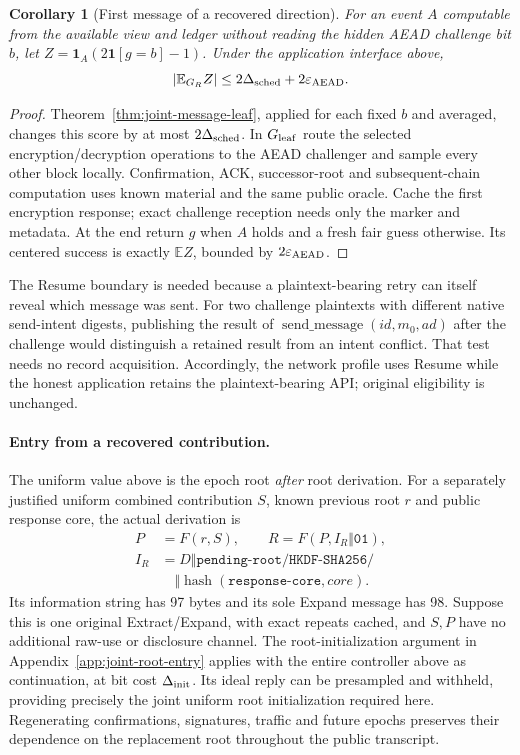 \documentclass[pdflatex]{sn-jnl}
\theoremstyle{thmstyleone}
\newtheorem{corollary}[theorem]{Corollary}
\theoremstyle{thmstylethree}
\theoremstyle{thmstyletwo}
\begin{document}
\begin{corollary}[First message of a recovered direction]
\label{cor:joint-first-message}
For an event $A$ computable from the available view and ledger without
reading the hidden AEAD challenge bit $b$, let
$Z=\mathbf1_A(2\mathbf1[g=b]-1)$.
Under the application interface above,
\[
 |\mathbb E_{G_R}Z|
 \le 2\Delta_{\rm sched}+2\varepsilon_{\rm AEAD}.
\]
\end{corollary}
\begin{proof}
Theorem~\ref{thm:joint-message-leaf}, applied for each fixed $b$ and
averaged, changes this score by at most $2\Delta_{\rm sched}$.
In $G_{\rm leaf}$ route the selected encryption/decryption operations
to the AEAD challenger and sample every other block locally.
Confirmation, ACK, successor-root and subsequent-chain computation uses
known material and the same public oracle. Cache the first encryption
response; exact challenge reception needs only the marker and metadata.
At the end return $g$ when $A$ holds and a fresh fair guess otherwise.
Its centered success is exactly $\mathbb E Z$, bounded by
$2\varepsilon_{\rm AEAD}$.
\end{proof}

The Resume boundary is needed because a plaintext-bearing retry can
itself reveal which message was sent. For two challenge plaintexts with
different native send-intent digests, publishing the result of
$\operatorname{send\_message}(id,m_0,ad)$ after the challenge would
distinguish a retained result from an intent conflict. That test needs
no record acquisition. Accordingly, the network profile uses Resume
while the honest application retains the plaintext-bearing API;
original eligibility is unchanged.

\paragraph{Entry from a recovered contribution.}
The uniform value above is the epoch root \emph{after} root derivation.
For a separately justified uniform combined contribution $S$, known
previous root $r$ and public response core, the actual derivation is
\[
\begin{aligned}
 P&=F(r,S),\qquad R=F(P,I_R\Vert\mathtt{01}),\\
 I_R&=D\Vert\texttt{pending-root/HKDF-SHA256/}\\
    &\quad\Vert\operatorname{hash}(\texttt{response-core},\mathit{core}).
\end{aligned}
\]
Its information string has 97 bytes and its sole Expand message has 98.
Suppose this is one original Extract/Expand, with exact repeats cached,
and $S,P$ have no additional raw-use or disclosure channel.
The root-initialization argument in Appendix~\ref{app:joint-root-entry}
applies with the entire controller above as continuation, at bit cost
$\Delta_{\rm init}$. Its ideal reply
can be presampled and withheld, providing precisely the joint uniform
root initialization required here. Regenerating confirmations, signatures,
traffic and future epochs preserves their dependence on the replacement
root throughout the public transcript.
\end{document}
